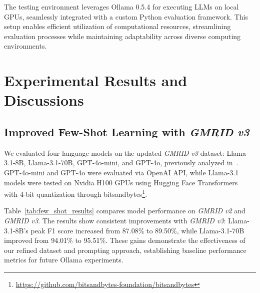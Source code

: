\documentclass[conference]{IEEEtran}
\begin{document}

The testing environment leverages Ollama 0.5.4 for executing LLMs on local GPUs, seamlessly integrated with a custom Python evaluation framework.
This setup enables efficient utilization of computational resources, streamlining evaluation processes while maintaining adaptability across diverse computing environments.

\section{Experimental Results and Discussions}

\subsection{Improved Few-Shot Learning with \textit{GMRID v3}}
We evaluated four language models on the updated \textit{GMRID v3} dataset: Llama-3.1-8B, Llama-3.1-70B, GPT-4o-mini, and GPT-4o, previously analyzed in~\cite{huang2024automating}. GPT-4o-mini and GPT-4o were evaluated via OpenAI API, while Llama-3.1 models were tested on Nvidia H100 GPUs using Hugging Face Transformers~\cite{wolf2020transformers} with 4-bit quantization through bitsandbytes\footnote{\url{https://github.com/bitsandbytes-foundation/bitsandbytes}}.

Table~\ref{tab:few_shot_results} compares model performance on \textit{GMRID v2} and \textit{GMRID v3}. The results show consistent improvements with \textit{GMRID v3}: Llama-3.1-8B's peak F1 score increased from 87.08\% to 89.50\%, while Llama-3.1-70B improved from 94.01\% to 95.51\%. These gains demonstrate the effectiveness of our refined dataset and prompting approach, establishing baseline performance metrics for future Ollama experiments.
\end{document}
